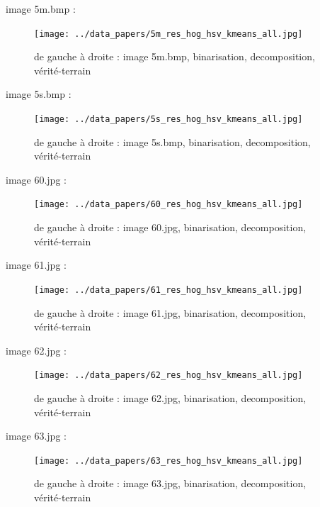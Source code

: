 \documentclass{book}
\begin{document}
image 5m.bmp : 
\begin{figure}[H]
\begin{center}
\texttt{[image: ../data\_papers/5m\_res\_hog\_hsv\_kmeans\_all.jpg]}
\end{center}
\caption{de gauche à droite : image 5m.bmp, binarisation, decomposition, vérité-terrain}
\label{5m}
\end{figure}
\clearpage


image 5s.bmp : 
\begin{figure}[H]
\begin{center}
\texttt{[image: ../data\_papers/5s\_res\_hog\_hsv\_kmeans\_all.jpg]}
\end{center}
\caption{de gauche à droite : image 5s.bmp, binarisation, decomposition, vérité-terrain}
\label{5s}
\end{figure}
\clearpage


image 60.jpg : 
\begin{figure}[H]
\begin{center}
\texttt{[image: ../data\_papers/60\_res\_hog\_hsv\_kmeans\_all.jpg]}
\end{center}
\caption{de gauche à droite : image 60.jpg, binarisation, decomposition, vérité-terrain}
\label{60}
\end{figure}
\clearpage


image 61.jpg : 
\begin{figure}[H]
\begin{center}
\texttt{[image: ../data\_papers/61\_res\_hog\_hsv\_kmeans\_all.jpg]}
\end{center}
\caption{de gauche à droite : image 61.jpg, binarisation, decomposition, vérité-terrain}
\label{61}
\end{figure}
\clearpage


image 62.jpg : 
\begin{figure}[H]
\begin{center}
\texttt{[image: ../data\_papers/62\_res\_hog\_hsv\_kmeans\_all.jpg]}
\end{center}
\caption{de gauche à droite : image 62.jpg, binarisation, decomposition, vérité-terrain}
\label{62}
\end{figure}
\clearpage


image 63.jpg : 
\begin{figure}[H]
\begin{center}
\texttt{[image: ../data\_papers/63\_res\_hog\_hsv\_kmeans\_all.jpg]}
\end{center}
\caption{de gauche à droite : image 63.jpg, binarisation, decomposition, vérité-terrain}
\label{63}
\end{figure}
\clearpage
\end{document}
